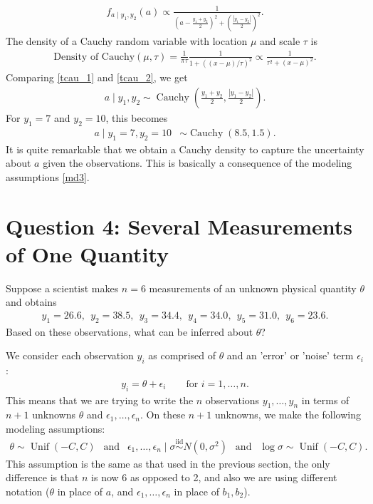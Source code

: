 \documentclass{scrartcl}
\def\qt#1{\qquad\text{#1}}
\begin{document}
\begin{align}\label{tcau_1}
  f_{a \mid y_1, y_2}(a) \propto \frac{1}{    \left(a-\frac{y_1+y_2}{2}\right)^2
    +\left(\frac{|y_1-y_2|}{2}\right)^2}. 
\end{align}
The density of a Cauchy random variable with location $\mu$ and scale
$\tau$ is
\begin{align} \label{tcau_2}
 \text{Density of Cauchy}(\mu, \tau) = \frac{1}{\pi\tau} \frac{1}{1+\left((x-\mu)/\tau\right)^2}
  \propto \frac{1}{\tau^2+(x-\mu)^2}. 
\end{align}
Comparing \eqref{tcau_1} and \eqref{tcau_2}, we get 
\begin{align*}
  a\mid y_1,y_2
  \sim \operatorname{Cauchy}\left(
  \frac{y_1+y_2}{2},\frac{|y_1-y_2|}{2}\right).
\end{align*}
For $y_1=7$ and $y_2=10$, this becomes
\begin{align*}
  a\mid y_1=7,y_2=10
  &\sim \operatorname{Cauchy}(8.5,1.5).
\end{align*}
It is quite remarkable that we obtain a Cauchy density to capture the
uncertainty about $a$ given the observations. This is basically a
consequence of the modeling assumptions \eqref{md3}. 

\section{Question 4: Several Measurements of One Quantity}

Suppose a scientist makes $n=6$ measurements of an unknown physical
quantity $\theta$ and obtains 
\begin{align*}
  y_1=26.6, ~~ y_2=38.5, ~~ y_3 = 34.4, ~~ y_4 = 34.0, ~~ y_5 = 31.0,
  ~~
  y_6
  =
  23.6. 
\end{align*}
Based on these observations, what can be inferred about $\theta$?

We consider each observation $y_i$ as comprised of
$\theta$ and an 'error' or 'noise' term $\epsilon_i$:
\begin{align*}
  y_i = \theta + \epsilon_i \qt{for $i = 1, \dots, n$}. 
\end{align*}
This means that we are trying to write the $n$ observations $y_1,
\dots, y_n$ in terms of $n+1$ unknowns $\theta$ and $\epsilon_1,
\dots, \epsilon_n$. On these $n+1$ unknowns, we make the following
modeling assumptions: 
\begin{align*}
  \theta \sim \operatorname{Unif}(-C,C) ~~ \text{ and } ~~ 
  \epsilon_1,\ldots,\epsilon_n\mid\sigma
  \overset{\mathrm{iid}}{\sim}N(0,\sigma^2) ~~ \text{ and } ~~ 
  \log\sigma \sim \operatorname{Unif}(-C,C).
\end{align*}
This assumption is the same as that used in the previous section, the
only difference is that $n$ is now 6 as opposed to 2, and also we are
using different notation ($\theta$ in place of $a$, and $\epsilon_1,
\dots, \epsilon_n$ in place of $b_1, b_2$).
\end{document}
